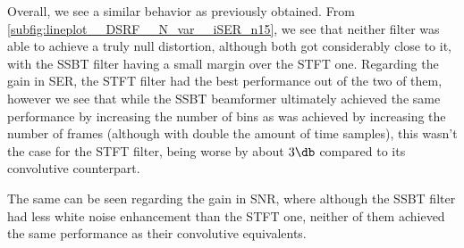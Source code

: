 Overall, we see a similar behavior as previously obtained. From \cref{subfig:lineplot__DSRF__N_var__iSER_n15}, we see that neither filter was able to achieve a truly null distortion, although both got considerably close to it, with the SSBT filter having a small margin over the STFT one. Regarding the gain in SER, the STFT filter had the best performance out of the two of them, however we see that while the SSBT beamformer ultimately achieved the same performance by increasing the number of bins as was achieved by increasing the number of frames (although with double the amount of time samples), this wasn't the case for the STFT filter, being worse by about $3\dB$ compared to its convolutive counterpart.

The same can be seen regarding the gain in SNR, where although the SSBT filter had less white noise enhancement than the STFT one, neither of them achieved the same performance as their convolutive equivalents.
%
%		
%		
%		
